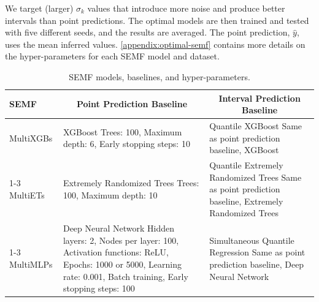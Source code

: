\documentclass{article}
\begin{document}
We target (larger) $\sigma_k$ values that introduce more noise and produce better intervals than point predictions. The optimal models are then trained and tested with five different seeds, and the results are averaged. The point prediction, $\hat{y}$, uses the mean inferred values. 
\autoref{appendix:optimal-semf} contains more details on the hyper-parameters for each SEMF model and dataset.

\begin{table}[!htbp]
\centering
\caption{SEMF models, baselines, and hyper-parameters.}
\vskip 0.15in
\label{tab:model_comparisons}
\resizebox{\textwidth}{!}
{\begin{tabular}{p{1.5cm} p{6cm} p{6cm}}
\toprule
\textbf{SEMF} & \multicolumn{1}{c}{\textbf{Point Prediction Baseline}} & \multicolumn{1}{c}{\textbf{Interval Prediction Baseline}} \\
\midrule
MultiXGBs & XGBoost \cite{chen2016xgboost} \newline \small{Trees: 100, Maximum depth: 6, Early stopping steps: 10} & Quantile XGBoost \newline \small{Same as point prediction baseline, XGBoost} \\
\cmidrule(lr){1-3}
MultiETs & Extremely Randomized Trees \cite{scikit-learn} \newline \small{Trees: 100, Maximum depth: 10} & Quantile Extremely Randomized Trees \cite{johnson2024et} \newline \small{Same as point prediction baseline, Extremely Randomized Trees} \\
\cmidrule(lr){1-3}
MultiMLPs & Deep Neural Network \newline \small{Hidden layers: 2, Nodes per layer: 100, Activation functions: ReLU, Epochs: 1000 or 5000, Learning rate: 0.001, Batch training, Early stopping steps: 100} & Simultaneous Quantile Regression \cite{tagasovska2019single} \newline \small{Same as point prediction baseline, Deep Neural Network} \\
\bottomrule
\end{tabular}
}
\end{table}
\end{document}
